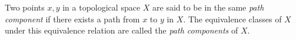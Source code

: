 \documentclass[12pt]{article}
\begin{document}
Two points $x,y$ in a topological space $X$ are said to be in the same {\em path component} if there exists a path from $x$ to $y$ in $X$. The equivalence classes of $X$ under this equivalence relation are called the {\em path components} of $X$.
\end{document}
